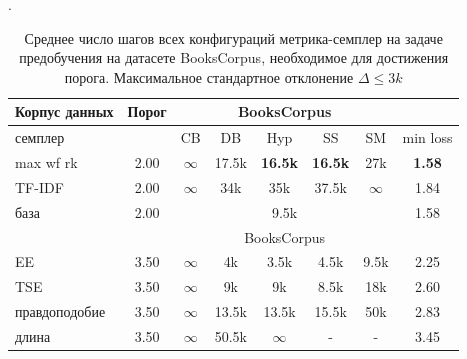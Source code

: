 \documentclass{spbau-diploma}
\begin{document}
\begin{table}
	\caption{Среднее число шагов всех конфигураций метрика-семплер на задаче предобучения на датасете BooksCorpus, необходимое для достижения порога. Максимальное стандартное отклонение $\Delta \le 3k$}.		\label{table:BooksCorpus_pretraining}
	\centering
	\begin{tabular}{l|c|ccccc|c}
		Корпус данных & Порог & \multicolumn{5}{c}{BooksCorpus} &\\
		\hline
		семплер & & CB & DB & Hyp & SS & SM & min loss\\
		\hline
		max wf rk & 2.00 & $\infty$ & 17.5k & {\bf 16.5k} & {\bf 16.5k} & 27k & {\bf 1.58} \\
		TF-IDF & 2.00 & $\infty$ & 34k & 35k & 37.5k & $\infty$ & 1.84 \\
		\hline
		база & 2.00 & \multicolumn{5}{c}{9.5k} & 1.58 \\
		\hline
		\hline
		& & \multicolumn{5}{c}{BooksCorpus} & \\
		\hline
		EE & 3.50 & $\infty$ & 4k & 3.5k & 4.5k & 9.5k & 2.25 \\
		TSE & 3.50 & $\infty$ & 9k & 9k & 8.5k & 18k & 2.60 \\
		правдоподобие & 3.50 & $\infty$ & 13.5k & 13.5k & 15.5k & 50k & 2.83 \\
		длина & 3.50 & $\infty$ & 50.5k & $\infty$ & - & - & 3.45 \\
		\hline
	\end{tabular}
\end{table}
\end{document}
